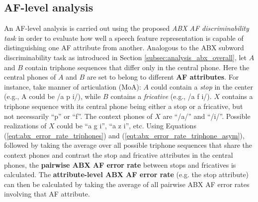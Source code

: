 \documentclass[transmag]{IEEEtran}
\begin{document}




\subsection{AF-level analysis}
\label{subsec:analysis_af_level}
An AF-level analysis is carried out using the proposed \textit{ABX  AF discriminability task} in order to evaluate how well a speech feature representation is capable of distinguishing one AF attribute from another.
Analogous to the ABX subword discriminability task as introduced in Section \ref{subsec:analysis_abx_overall}, let $A$ and $B$ contain triphone sequences that differ only in the central phone. Here the central phones of  $A$ and $B$ are set to belong to different \textbf{AF attributes}. For instance, take manner of articulation (MoA): $A$ could contain a  \textit{stop} in the center (e.g., A could be /a p i/), 
while  $B$  contains a \textit{fricative} (e.g., /a f i/). $X$ contains a triphone sequence with its central phone being either a  stop or a fricative, but  not necessarily  ``p'' or ``f''.
The context phones of $X$ are ``/a/'' and ``/i/''. Possible realizations of $X$ could be ``a g i'', ``a z i'', etc.
Using Equations (\ref{eqt:abx_error_rate_triphones}) and (\ref{eqt:abx_error_rate_triphone_asym}), followed by taking the average over all possible triphone sequences that share the context phones and contrast the stop and fricative attributes in the central phones, the \textbf{pairwise ABX AF error rate} between stops and fricatives is calculated.
The \textbf{attribute-level ABX AF error rate} (e.g. the stop attribute) can then be calculated by taking the average of all pairwise ABX AF error rates involving that AF attribute.
\end{document}
